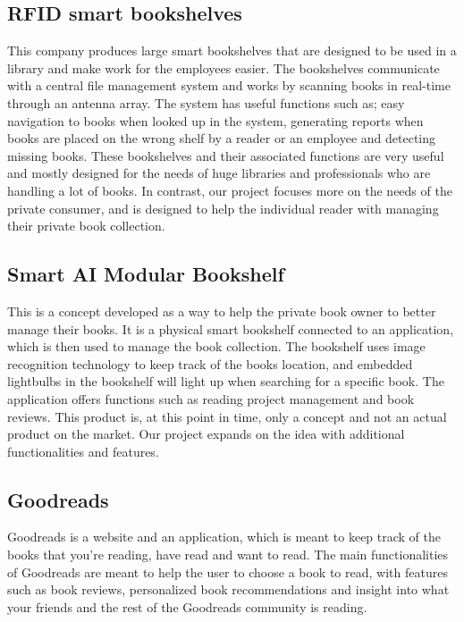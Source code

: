 \documentclass[conference]{IEEEtran}
\begin{document}
\subsection{RFID smart bookshelves} 
This company produces large smart bookshelves that are designed to be used in a library and make work for the employees easier. The bookshelves communicate with a central file management system and works by scanning books in real-time through an antenna array. The system has useful functions such as; easy navigation to books when looked up in the system, generating reports when books are placed on the wrong shelf by a reader or an employee and detecting missing books. These bookshelves and their associated functions are very useful and mostly designed for the needs of huge libraries and professionals who are handling a lot of books. In contrast, our project focuses more on the needs of the private consumer, and is designed to help the individual reader with managing their private book collection.\cite{RFID} \\

\subsection{Smart AI Modular Bookshelf} 
This is a concept developed as a way to help the private book owner to better manage their books. It is a physical smart bookshelf connected to an application, which is then used to manage the book collection. The bookshelf uses image recognition technology to keep track of the books location, and embedded lightbulbs in the bookshelf will light up when searching for a specific book. The application offers functions such as reading project management and book reviews. This product is, at this point in time, only a concept and not an actual product on the market. Our project expands on the idea with additional functionalities and features.\cite{Smartbookshelf}\\

\subsection{Goodreads} 
Goodreads is a website and an application, which is meant to keep track of the books that you’re reading, have read and want to read. The main functionalities of Goodreads are meant to help the user to choose a book to read, with features such as book reviews, personalized book recommendations and insight into what your friends and the rest of the Goodreads community is reading. \cite{Goodreads}\\
\end{document}
